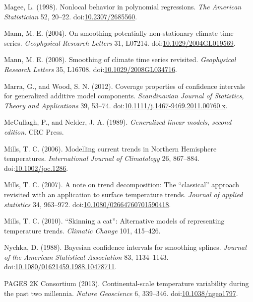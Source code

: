 \documentclass[12pt,]{article}
\begin{document}
\hypertarget{ref-Magee1998-oq}{}
Magee, L. (1998). Nonlocal behavior in polynomial regressions. \emph{The
American Statistician} 52, 20--22.
doi:\href{https://doi.org/10.2307/2685560}{10.2307/2685560}.

\hypertarget{ref-Mann2004-kd}{}
Mann, M. E. (2004). On smoothing potentially non-stationary climate time
series. \emph{Geophysical Research Letters} 31, L07214.
doi:\href{https://doi.org/10.1029/2004GL019569}{10.1029/2004GL019569}.

\hypertarget{ref-Mann2008-yk}{}
Mann, M. E. (2008). Smoothing of climate time series revisited.
\emph{Geophysical Research Letters} 35, L16708.
doi:\href{https://doi.org/10.1029/2008GL034716}{10.1029/2008GL034716}.

\hypertarget{ref-Marra2012-bq}{}
Marra, G., and Wood, S. N. (2012). Coverage properties of confidence
intervals for generalized additive model components. \emph{Scandinavian
Journal of Statistics, Theory and Applications} 39, 53--74.
doi:\href{https://doi.org/10.1111/j.1467-9469.2011.00760.x}{10.1111/j.1467-9469.2011.00760.x}.

\hypertarget{ref-McCullagh1989-gv}{}
McCullagh, P., and Nelder, J. A. (1989). \emph{Generalized linear
models, second edition}. CRC Press.

\hypertarget{ref-Mills2006-rb}{}
Mills, T. C. (2006). Modelling current trends in Northern Hemisphere
temperatures. \emph{International Journal of Climatology} 26, 867--884.
doi:\href{https://doi.org/10.1002/joc.1286}{10.1002/joc.1286}.

\hypertarget{ref-Mills2007-pq}{}
Mills, T. C. (2007). A note on trend decomposition: The ``classical''
approach revisited with an application to surface temperature trends.
\emph{Journal of applied statistics} 34, 963--972.
doi:\href{https://doi.org/10.1080/02664760701590418}{10.1080/02664760701590418}.

\hypertarget{ref-Mills2010-oe}{}
Mills, T. C. (2010). ``Skinning a cat'': Alternative models of
representing temperature trends. \emph{Climatic Change} 101, 415--426.

\hypertarget{ref-Nychka1988-rz}{}
Nychka, D. (1988). Bayesian confidence intervals for smoothing splines.
\emph{Journal of the American Statistical Association} 83, 1134--1143.
doi:\href{https://doi.org/10.1080/01621459.1988.10478711}{10.1080/01621459.1988.10478711}.

\hypertarget{ref-PAGES_2k_Consortium2013-fm}{}
PAGES 2K Consortium (2013). Continental-scale temperature variability
during the past two millennia. \emph{Nature Geoscience} 6, 339--346.
doi:\href{https://doi.org/10.1038/ngeo1797}{10.1038/ngeo1797}.
\end{document}
